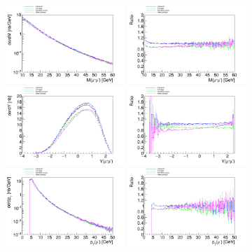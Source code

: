 \begin{figure}[h!]
\includegraphics[width=0.4\textwidth]{figures/Mll_inc_cut.pdf}
\includegraphics[width=0.4\textwidth]{figures/RatioMll_inc_cut.pdf}
\includegraphics[width=0.4\textwidth]{figures/Yll_inc_cut.pdf}
\includegraphics[width=0.4\textwidth]{figures/RatioYll_inc_cut.pdf}
\includegraphics[width=0.4\textwidth]{figures/pTl_inc_cut.pdf}
\includegraphics[width=0.4\textwidth]{figures/RatiopTl_inc_cut.pdf}

\end{figure}
